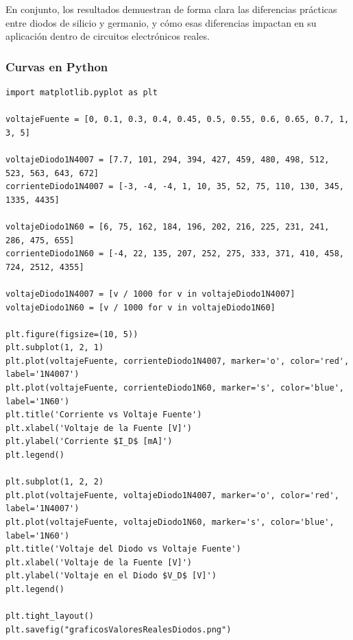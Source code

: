 \sangria{} En conjunto, los resultados demuestran de forma clara las diferencias prácticas entre diodos de silicio y germanio, y cómo esas diferencias impactan en su aplicación dentro de circuitos electrónicos reales.

\inicioCodigo{}
\subsubsection{Curvas en Python}

\begin{verbatim}
import matplotlib.pyplot as plt

voltajeFuente = [0, 0.1, 0.3, 0.4, 0.45, 0.5, 0.55, 0.6, 0.65, 0.7, 1, 3, 5]

voltajeDiodo1N4007 = [7.7, 101, 294, 394, 427, 459, 480, 498, 512, 523, 563, 643, 672]
corrienteDiodo1N4007 = [-3, -4, -4, 1, 10, 35, 52, 75, 110, 130, 345, 1335, 4435]

voltajeDiodo1N60 = [6, 75, 162, 184, 196, 202, 216, 225, 231, 241, 286, 475, 655]
corrienteDiodo1N60 = [-4, 22, 135, 207, 252, 275, 333, 371, 410, 458, 724, 2512, 4355]

voltajeDiodo1N4007 = [v / 1000 for v in voltajeDiodo1N4007]
voltajeDiodo1N60 = [v / 1000 for v in voltajeDiodo1N60]

plt.figure(figsize=(10, 5))
plt.subplot(1, 2, 1)
plt.plot(voltajeFuente, corrienteDiodo1N4007, marker='o', color='red', label='1N4007')
plt.plot(voltajeFuente, corrienteDiodo1N60, marker='s', color='blue', label='1N60')
plt.title('Corriente vs Voltaje Fuente')
plt.xlabel('Voltaje de la Fuente [V]')
plt.ylabel('Corriente $I_D$ [mA]')
plt.legend()

plt.subplot(1, 2, 2)
plt.plot(voltajeFuente, voltajeDiodo1N4007, marker='o', color='red', label='1N4007')
plt.plot(voltajeFuente, voltajeDiodo1N60, marker='s', color='blue', label='1N60')
plt.title('Voltaje del Diodo vs Voltaje Fuente')
plt.xlabel('Voltaje de la Fuente [V]')
plt.ylabel('Voltaje en el Diodo $V_D$ [V]')
plt.legend()

plt.tight_layout()
plt.savefig("graficosValoresRealesDiodos.png")

\end{verbatim}


\finalCodigo{}
